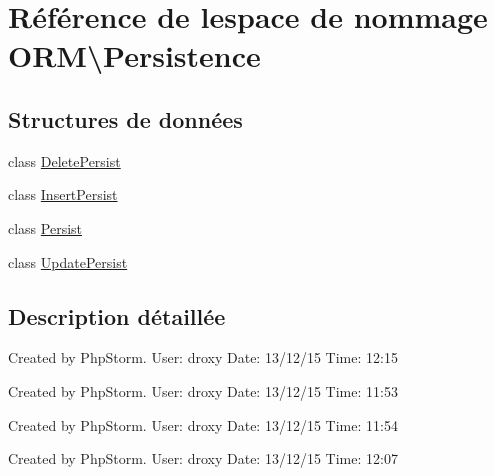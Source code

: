 \hypertarget{namespace_o_r_m_1_1_persistence}{}\section{Référence de l\textquotesingle{}espace de nommage O\+RM\textbackslash{}Persistence}
\label{namespace_o_r_m_1_1_persistence}
\subsection*{Structures de données}
\begin{DoxyCompactItemize}
\item 
class \hyperlink{class_o_r_m_1_1_persistence_1_1_delete_persist}{Delete\+Persist}
\item 
class \hyperlink{class_o_r_m_1_1_persistence_1_1_insert_persist}{Insert\+Persist}
\item 
class \hyperlink{class_o_r_m_1_1_persistence_1_1_persist}{Persist}
\item 
class \hyperlink{class_o_r_m_1_1_persistence_1_1_update_persist}{Update\+Persist}
\end{DoxyCompactItemize}


\subsection{Description détaillée}
Created by Php\+Storm. User\+: droxy Date\+: 13/12/15 Time\+: 12\+:15

Created by Php\+Storm. User\+: droxy Date\+: 13/12/15 Time\+: 11\+:53

Created by Php\+Storm. User\+: droxy Date\+: 13/12/15 Time\+: 11\+:54

Created by Php\+Storm. User\+: droxy Date\+: 13/12/15 Time\+: 12\+:07 